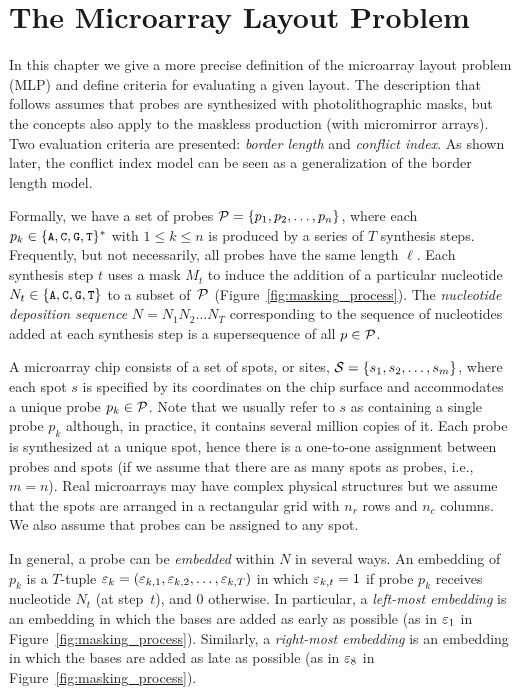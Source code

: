 \chapter{The Microarray Layout Problem}
\label{ch:mlp}

In this chapter we give a more precise definition of the microarray layout
problem (MLP) and define criteria for evaluating a given layout. The description
that follows assumes that probes are synthesized with photolithographic masks,
but the concepts also apply to the maskless production (with micromirror
arrays). Two evaluation criteria are presented: \emph{border length} and
\emph{conflict index}. As shown later, the conflict index model can be seen as a
generalization of the border length model.

Formally, we have a set of probes ${\mathcal{P}} = \{p_{1}, p_{2}, \dots, p_{n}\}$,
where each $p_k \in \{\text{\small{\tt A}},\text{\small{\tt C}},\text{\small{\tt G}},\text{\small{\tt T}}\}^\ast$ with $1 \leq k \leq n$ is produced
by a series of $T$
synthesis steps. Frequently, but not necessarily, all probes have the same
length $\ell$. Each synthesis step $t$ uses a mask $M_t$ to induce the addition
of a particular nucleotide $N_t \in \{\text{\small{\tt A}},\text{\small{\tt C}},\text{\small{\tt G}},\text{\small{\tt T}}\}$ to a subset of~${\mathcal{P}}$
(Figure~\ref{fig:masking_process}). The \emph{nucleotide deposition sequence}
$N = N_{1} N_{2} \ldots N_{T}$ corresponding to the sequence of nucleotides
added at each synthesis step is a supersequence of all $p \in {\mathcal{P}}$.

A microarray chip consists of a set of spots, or sites,
${\mathcal{S}} = \{s_{1}, s_{2}, \dots, s_{m}\}$, where each spot $s$ is specified by
its coordinates on the chip surface and accommodates a unique probe
$p_k \in {\mathcal{P}}$. Note that we usually refer to $s$ as containing a single probe
$p_k$ although, in practice, it contains several million copies of it. Each
probe is synthesized at a unique spot, hence there is a one-to-one assignment
between probes and spots (if we assume that there are as many spots as probes,
i.e., $m=n$). Real microarrays may have complex physical structures but
we assume that the spots are arranged in a rectangular grid with
$n_r$ rows and $n_c$ columns. We also assume that probes can be assigned to any
spot.

In general, a probe can be \emph{embedded} within $N$ in several ways. An
embedding of $p_{k}$ is a $T$-tuple
$\varepsilon_{k} = (\varepsilon_{k,1}, \varepsilon_{k,2}, \dots, \varepsilon_{k,T})$ in which
$\varepsilon_{k,t} = 1$ if probe $p_{k}$ receives nucleotide $N_{t}$ (at step~$t$), and
0 otherwise. In particular, a \emph{left-most embedding} is an embedding in
which the bases are added as early as possible (as in $\varepsilon_1$ in
Figure~\ref{fig:masking_process}). Similarly, a \emph{right-most embedding} is
an embedding in which the bases are added as late as possible (as in $\varepsilon_8$ in
Figure~\ref{fig:masking_process}).

